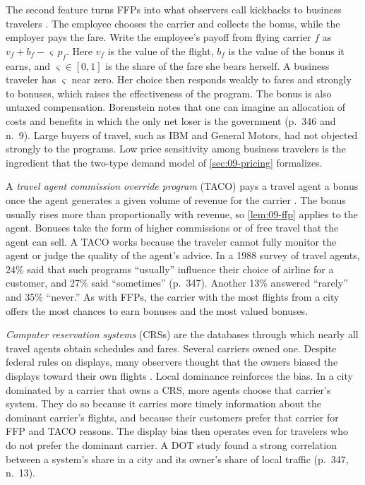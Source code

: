 The second feature turns FFPs into what observers call kickbacks to business travelers
\citep[p.~346]{Borenstein1989}. The employee chooses the carrier and collects the bonus, while the employer pays
the fare. Write the employee's payoff from flying carrier $f$ as $v_f + b_f - \varsigma\, p_f$. Here $v_f$ is the
value of the flight, $b_f$ is the value of the bonus it earns, and $\varsigma \in [0,1]$ is the share of the fare
she bears herself. A business traveler has $\varsigma$ near zero. Her choice then responds weakly to fares and
strongly to bonuses, which raises the effectiveness of the program. The bonus is also untaxed compensation.
Borenstein notes that one can imagine an allocation of costs and benefits in which the only net loser is the
government (p.~346 and n.~9). Large buyers of travel, such as IBM and General Motors, had not objected strongly
to the programs. Low price sensitivity among business travelers is the ingredient that the two-type demand
model of \cref{sec:09-pricing} formalizes.

A \emph{travel agent commission override program} (TACO) pays a travel agent a bonus once the agent generates a
given volume of revenue for the carrier \citep[pp.~346--347]{Borenstein1989}. The bonus usually rises more
than proportionally with revenue, so \cref{lem:09-ffp} applies to the agent. Bonuses take the form of higher
commissions or of free travel that the agent can sell. A TACO works because the traveler cannot fully monitor
the agent or judge the quality of the agent's advice. In a 1988 survey of travel agents, 24\% said that such
programs ``usually'' influence their choice of airline for a customer, and 27\% said ``sometimes'' (p.~347).
Another 13\% answered ``rarely'' and 35\% ``never.'' As with FFPs, the carrier with the most flights from a
city offers the most chances to earn bonuses and the most valued bonuses.

\emph{Computer reservation systems} (CRSs) are the databases through which nearly all travel agents obtain
schedules and fares. Several carriers owned one. Despite federal rules on displays, many observers thought that
the owners biased the displays toward their own flights \citep[p.~347]{Borenstein1989}. Local dominance
reinforces the bias. In a city dominated by a carrier that owns a CRS, more agents choose that carrier's
system. They do so because it carries more timely information about the dominant carrier's flights, and
because their customers prefer that carrier for FFP and TACO reasons. The display bias then operates even for
travelers who do not prefer the dominant carrier. A DOT study found a strong correlation between a system's
share in a city and its owner's share of local traffic (p.~347, n.~13).

